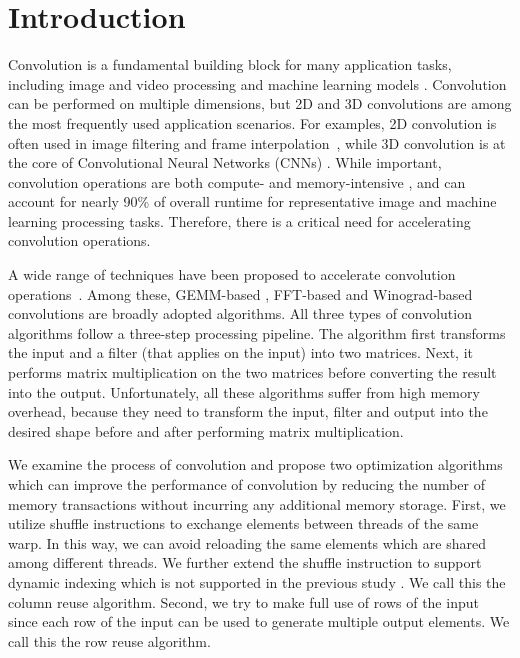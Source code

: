 \section{Introduction}
Convolution is a fundamental building block for many application tasks, including image and video processing and machine learning
models \cite{Perrot2014Fine,Ma2014Optimized,Rudi2015Image,Niklaus2017Video,Krizhevsky2012ImageNet,SimonyanZ14a,HeZRS16,SzegedyLJSRAEVR15}. Convolution can be performed on multiple dimensions, but 2D and 3D convolutions are among the most frequently used
application scenarios. For examples, 2D convolution is often used in image filtering and frame
interpolation~\cite{Perrot2014Fine,Ma2014Optimized,Rudi2015Image,Niklaus2017Video}, while 3D convolution is at the core of Convolutional
Neural Networks (CNNs) \cite{Krizhevsky2012ImageNet,SimonyanZ14a,HeZRS16,SzegedyLJSRAEVR15}. While important, convolution operations are both compute- and memory-intensive \cite{cavigelli2015accelerating},
and can account for nearly 90\% of overall runtime \cite{Li2016Performance} for representative image and machine learning processing tasks.
Therefore, there is a critical need for accelerating convolution operations.


A wide range of techniques have been proposed to accelerate convolution
operations~\cite{Iandola2014Communication,vasilache2014fast,lavin2016fast,cho2017mec,Zhen2018Optimizing,Vasudevan2017Parallel,Chellapilla2006High}.
 Among these, GEMM-based
\cite{Vasudevan2017Parallel} \cite{Chellapilla2006High}, FFT-based \cite{vasilache2014fast} and Winograd-based convolutions
\cite{lavin2016fast} are broadly adopted algorithms. All three types of convolution algorithms follow a three-step processing pipeline. The
algorithm first transforms the input and a filter (that applies on the input) into two matrices. Next, it performs matrix multiplication on
the two matrices before converting the result into the output. Unfortunately, all these algorithms suffer from high memory overhead,
because they need to transform the input, filter and output into the desired shape before and after performing matrix multiplication.

We examine the process of convolution and propose two optimization algorithms which can improve the performance of convolution by reducing
the number of memory transactions without incurring any additional memory storage. First, we utilize shuffle instructions to exchange elements between threads of the same warp. In this way, we can
avoid reloading the same elements which are shared among different threads. We further extend the shuffle instruction to support dynamic
indexing which is not supported in the previous study \cite{vasilache2014fast}. We call this the column reuse algorithm. Second, we try to
make full use of rows of the input since each row of the input can be used to generate multiple output elements. We call this the row reuse
algorithm.

